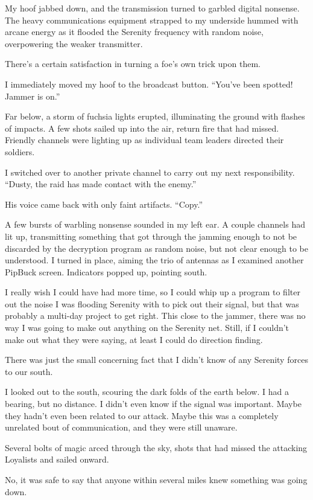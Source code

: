 My hoof jabbed down, and the transmission turned to garbled digital nonsense. The heavy communications equipment strapped to my underside hummed with arcane energy as it flooded the Serenity frequency with random noise, overpowering the weaker transmitter.

There’s a certain satisfaction in turning a foe’s own trick upon them.

I immediately moved my hoof to the broadcast button. “You’ve been spotted! Jammer is on.”

Far below, a storm of fuchsia lights erupted, illuminating the ground with flashes of impacts. A few shots sailed up into the air, return fire that had missed. Friendly channels were lighting up as individual team leaders directed their soldiers.

I switched over to another private channel to carry out my next responsibility. “Dusty, the raid has made contact with the enemy.”

His voice came back with only faint artifacts. “Copy.”

A few bursts of warbling nonsense sounded in my left ear. A couple channels had lit up, transmitting something that got through the jamming enough to not be discarded by the decryption program as random noise, but not clear enough to be understood. I turned in place, aiming the trio of antennas as I examined another PipBuck screen. Indicators popped up, pointing south.

I really wish I could have had more time, so I could whip up a program to filter out the noise I was flooding Serenity with to pick out their signal, but that was probably a multi-day project to get right. This close to the jammer, there was no way I was going to make out anything on the Serenity net. Still, if I couldn’t make out what they were saying, at least I could do direction finding.

There was just the small concerning fact that I didn’t know of any Serenity forces to our south.

I looked out to the south, scouring the dark folds of the earth below. I had a bearing, but no distance. I didn’t even know if the signal was important. Maybe they hadn’t even been related to our attack. Maybe this was a completely unrelated bout of communication, and they were still unaware.

Several bolts of magic arced through the sky, shots that had missed the attacking Loyalists and sailed onward.

No, it was safe to say that anyone within several miles knew something was going down.


